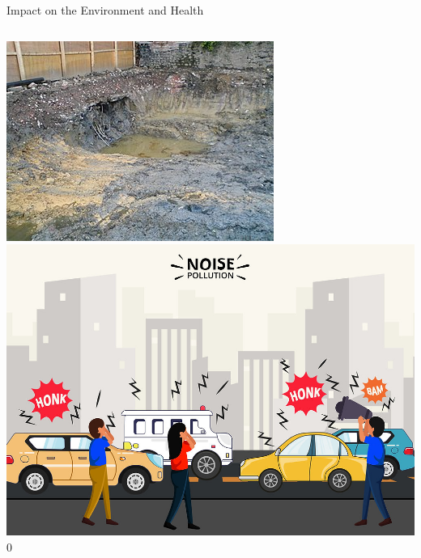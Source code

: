 \documentclass{beamer}
\begin{document}
\begin{frame}{Impact on the Environment and Health}
  \begin{columns}
    \includegraphics[width=\textwidth]{images/soil-pollution.png}
    \includegraphics[width=\textwidth]{images/noise-pollution.png}0
  \end{columns}
\end{frame}
\end{document}
